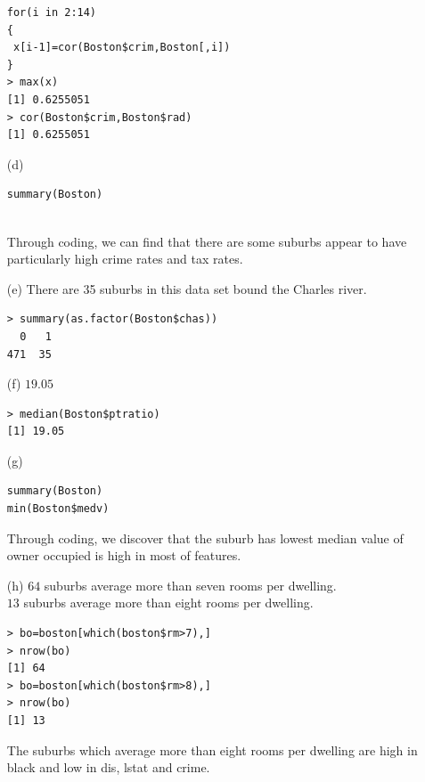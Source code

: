 \documentclass[12pt]{article}
\begin{document}
\begin{itemize}
\begin{verbatim}
for(i in 2:14)
{
 x[i-1]=cor(Boston$crim,Boston[,i])
}
> max(x)
[1] 0.6255051
> cor(Boston$crim,Boston$rad)
[1] 0.6255051
\end{verbatim}
\item[(d)]
\begin{verbatim}
summary(Boston)
\end{verbatim}
\ \\
Through coding, we can find that there are some suburbs appear to have particularly high crime rates and tax rates.
\item[(e)]
There are 35 suburbs in this data set bound the Charles river.
\begin{verbatim}
> summary(as.factor(Boston$chas))
  0   1
471  35
\end{verbatim}
\item[(f)]
$19.05$
\begin{verbatim}
> median(Boston$ptratio)
[1] 19.05
\end{verbatim}
\item[(g)]
\begin{verbatim}
summary(Boston)
min(Boston$medv)
\end{verbatim}
Through coding, we discover that the suburb has lowest median value of owner occupied is high in most of features.
\item[(h)]
$64$ suburbs average more than seven rooms per dwelling.\\[2ex]
$13$ suburbs average more than eight rooms per dwelling.
\begin{verbatim}
> bo=boston[which(boston$rm>7),]
> nrow(bo)
[1] 64
> bo=boston[which(boston$rm>8),]
> nrow(bo)
[1] 13
\end{verbatim}
The suburbs which average more than eight rooms per dwelling are high in black and low in dis, lstat and crime.
\end{itemize}
\end{document}

